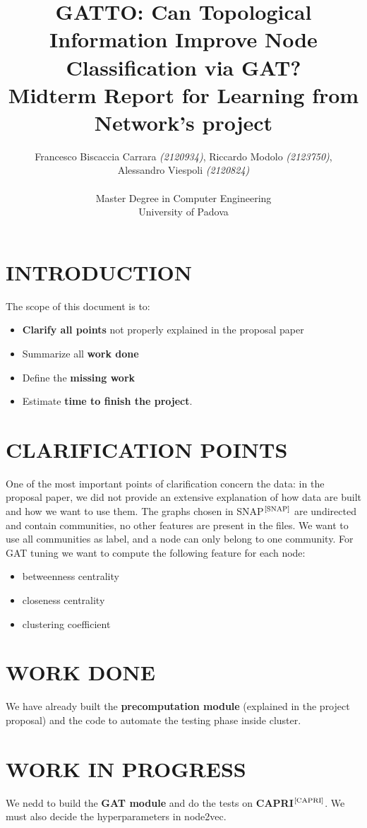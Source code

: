 \documentclass[12pt,conference]{ieeeconf} %
\title{GATTO: Can Topological Information Improve Node Classification via GAT?\\
\large Midterm Report for Learning from Network's project \\}
\author{Francesco Biscaccia Carrara \textit{(2120934)}, Riccardo Modolo \textit{(2123750)},\\ Alessandro Viespoli \textit{(2120824)} %
\\\\ Master Degree in Computer Engineering \\
University of Padova \\
}
\begin{document}
\maketitle
\thispagestyle{plain}
\pagestyle{plain}

\section{INTRODUCTION} 
The scope of this document is to:
\begin{itemize}
    \item \textbf{Clarify all points} not properly explained in the proposal paper
    \item Summarize all \textbf{work done}
    \item Define the \textbf{missing work} 
    \item Estimate \textbf{time to finish the project}.
\end{itemize}

\section{CLARIFICATION POINTS}
One of the most important points of clarification concern the data: in the proposal paper, we did not provide an extensive explanation of how data are built and how we want to use them.
The graphs chosen in SNAP$^\text{\cite{SNAP}}$ are undirected and contain communities, no other features are present in the files. 
We want to use all communities as label, and a node can only belong to one community.
For GAT tuning we want to compute the following feature for each node:
\begin{itemize}
    \item betweenness centrality
    \item closeness centrality
    \item clustering coefficient
\end{itemize}


\section{WORK DONE}
We have already built the \textbf{precomputation module} (explained in the project proposal) 
and the code to automate the testing phase inside cluster.

\section{WORK IN PROGRESS}
We nedd to build the \textbf{GAT module} and do the tests on \textbf{CAPRI}$^\text{\cite{CAPRI}}$. 
We must also decide the hyperparameters in node2vec.
\end{document}
